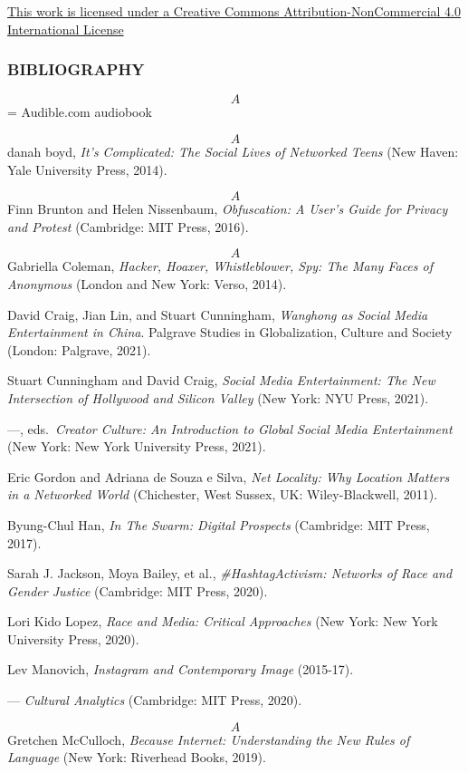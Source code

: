 \documentclass[]{tufte-handout}
\begin{document}
\href{http://creativecommons.org/licenses/by-nc/4.0/}{This work is
licensed under a Creative Commons Attribution-NonCommercial 4.0
International License}

\hypertarget{bibliography}{%
\subsubsection{BIBLIOGRAPHY}\label{bibliography}}

\[A\] = Audible.com audiobook

\[A\] danah boyd, \emph{It's Complicated: The Social Lives of Networked
Teens} (New Haven: Yale University Press, 2014).

\[A\] Finn Brunton and Helen Nissenbaum, \emph{Obfuscation: A User's
Guide for Privacy and Protest} (Cambridge: MIT Press, 2016).

\[A\] Gabriella Coleman, \emph{Hacker, Hoaxer, Whistleblower, Spy: The
Many Faces of Anonymous} (London and New York: Verso, 2014).

David Craig, Jian Lin, and Stuart Cunningham, \emph{Wanghong as Social
Media Entertainment in China}. Palgrave Studies in Globalization,
Culture and Society (London: Palgrave, 2021).

Stuart Cunningham and David Craig, \emph{Social Media Entertainment: The
New Intersection of Hollywood and Silicon Valley} (New York: NYU Press,
2021).

---, eds.~\emph{Creator Culture: An Introduction to Global Social Media
Entertainment} (New York: New York University Press, 2021).

Eric Gordon and Adriana de Souza e Silva, \emph{Net Locality: Why
Location Matters in a Networked World} (Chichester, West Sussex, UK:
Wiley-Blackwell, 2011).

Byung-Chul Han, \emph{In The Swarm: Digital Prospects} (Cambridge: MIT
Press, 2017).

Sarah J. Jackson, Moya Bailey, et al., \emph{\#HashtagActivism: Networks
of Race and Gender Justice} (Cambridge: MIT Press, 2020).

Lori Kido Lopez, \emph{Race and Media: Critical Approaches} (New York:
New York University Press, 2020).

Lev Manovich, \emph{Instagram and Contemporary Image} (2015-17).

--- \emph{Cultural Analytics} (Cambridge: MIT Press, 2020).

\[A\] Gretchen McCulloch, \emph{Because Internet: Understanding the New
Rules of Language} (New York: Riverhead Books, 2019).
\end{document}
